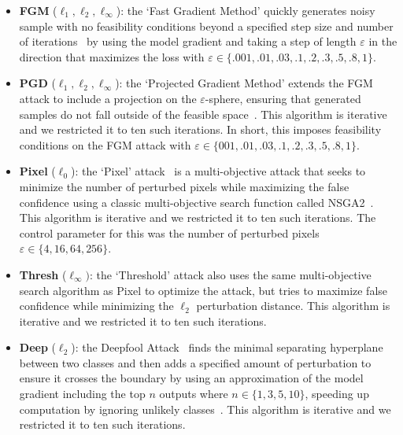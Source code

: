 \begin{itemize}
    \item \textbf{FGM} ($\ell_1, \ell_2, \ell_{\infty}$): the `Fast Gradient Method' quickly generates noisy sample with no feasibility conditions beyond a specified step size and number of iterations~\citep{fgm} by using the model gradient and taking a step of length $\varepsilon$ in the direction that maximizes the loss with $\varepsilon \in \{.001,.01,.03,.1,.2,.3,.5,.8,1\}$.

    \item \textbf{PGD}  ($\ell_1, \ell_2, \ell_{\infty}$):  the `Projected Gradient Method' extends the FGM attack to include a projection on the $\varepsilon$-sphere, ensuring that generated samples do not fall outside of the feasible space~\citep{madry2017towards}. This algorithm is iterative and we restricted it to ten such iterations. In short, this imposes feasibility conditions on the FGM attack with $\varepsilon \in \{001,.01,.03,.1,.2,.3,.5,.8,1\}$.

    \item \textbf{Pixel} ($\ell_0$): the `Pixel' attack~\citep{pixelattack} is a multi-objective attack that seeks to minimize the number of perturbed pixels  while maximizing the false confidence using a classic multi-objective search function called NSGA2~\citep{nsga2}. This algorithm is iterative and we restricted it to ten such iterations. The control parameter for this was the number of perturbed pixels $\varepsilon \in \{4, 16, 64, 256\}$.

    \item \textbf{Thresh} ($\ell_{\infty})$: the `Threshold' attack also uses the same multi-objective search algorithm as Pixel to optimize the attack, but tries to maximize false confidence while minimizing the $\ell_2$ perturbation distance. This algorithm is iterative and we restricted it to ten such iterations.

    \item \textbf{Deep} ($\ell_2$): the Deepfool Attack~\citep{deepfool} finds the minimal separating hyperplane between two classes and then adds a specified amount of perturbation to ensure it crosses the boundary by using an approximation of the model gradient including the top $n$ outputs where $n \in \{1,3,5,10\}$, speeding up computation by ignoring unlikely classes~\citep{deepfool}. This algorithm is iterative and we restricted it to ten such iterations.


\end{itemize}
